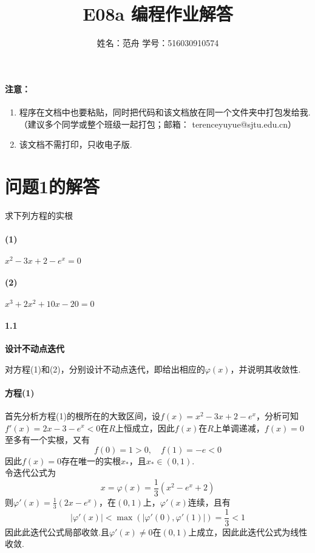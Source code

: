 

\title{E08a 编程作业解答}
\author{姓名：范舟 \quad 学号：516030910574}
\date{}


\maketitle

\paragraph{注意：} 
\begin{enumerate}
\item 程序在文档中也要粘贴，同时把代码和该文档放在同一个文件夹中打包发给我.（建议多个同学或整个班级一起打包；邮箱： terenceyuyue@sjtu.edu.cn）
\item 该文档不需打印，只收电子版.
\end{enumerate}

\section{问题1的解答}
求下列方程的实根
\paragraph{(1)} $x^2 - 3x + 2 - e^x = 0$
\paragraph{(2)} $x^3 + 2x^2 + 10x - 20 = 0$

\paragraph{1.1} \textbf{设计不动点迭代}
\par 对方程(1)和(2)，分别设计不动点迭代，即给出相应的$\varphi(x)$，并说明其收敛性.
\paragraph{方程(1)} 首先分析方程(1)的根所在的大致区间，设$f(x) = x^2 - 3x + 2 - e^x$，分析可知$f'(x) = 2x - 3 - e^x < 0$在$R$上恒成立，因此$f(x)$在$R$上单调递减，$f(x) = 0$至多有一个实根，又有
\[f(0) = 1 > 0, \quad f(1) = -e < 0\]
因此$f(x) = 0$存在唯一的实根$x_*$，且$x_* \in (0, 1)$.\\
令迭代公式为
\[x = \varphi(x) = \frac{1}{3} (x^2 - e^x + 2)\]
则$\varphi'(x) = \frac{1}{3} (2x - e^x)$，在$(0, 1)$上，$\varphi'(x)$连续，且有
\[|\varphi'(x)| < \max (|\varphi'(0), \varphi'(1)|) = \frac{1}{3} < 1\]
因此此迭代公式局部收敛.且$\varphi'(x) \ne 0$在$(0, 1)$上成立，因此此迭代公式为线性收敛.

